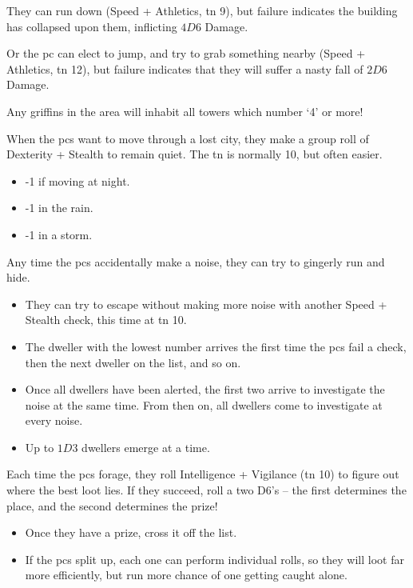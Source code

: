 \begin{multicols}{2}
\begin{enumerate}
  They can run down (Speed + Athletics, \gls{tn} 9), but failure indicates the building has collapsed upon them, inflicting $4D6$ Damage.

  Or the \gls{pc} can elect to jump, and try to grab something nearby (Speed + Athletics, \gls{tn} 12), but failure indicates that they will suffer a nasty fall of $2D6$ Damage.
\end{enumerate}

Any griffins in the area will inhabit all towers which number `4' or more!


When the \glspl{pc} want to move through a lost city, they make a group roll of Dexterity + Stealth to remain quiet.
The \gls{tn} is normally 10, but often easier.

\begin{itemize}
  \item
  -1 if moving at night.
  \item
  -1 in the rain.
  \item
  -1 in a storm.
\end{itemize}


Any time the \glspl{pc} accidentally make a noise, they can try to gingerly run and hide.

\begin{itemize}
  \item
  They can try to escape without making more noise with another Speed + Stealth check, this time at \gls{tn} 10.
  \item
  The dweller with the lowest number arrives the first time the \glspl{pc} fail a check, then the next dweller on the list, and so on.
  \item
  Once all dwellers have been alerted, the first two arrive to investigate the noise at the same time.
  From then on, all dwellers come to investigate at every noise.
  \item
  Up to $1D3$ dwellers emerge at a time.
\end{itemize}


Each time the \glspl{pc} forage, they roll Intelligence + Vigilance (\gls{tn} 10) to figure out where the best loot lies.
If they succeed, roll a two D6's -- the first determines the place, and the second determines the prize!

\begin{itemize}
  \item
  Once they have a prize, cross it off the list.
  \item
  If the \glspl{pc} split up, each one can perform individual rolls, so they will loot far more efficiently, but run more chance of one getting caught alone.

\end{itemize}

\end{multicols}
